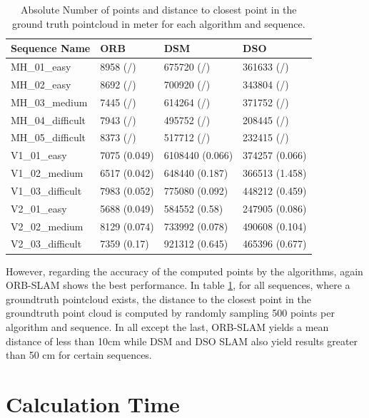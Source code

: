 	\begin{table}
	\caption{Absolute Number of points and distance to closest point in the ground truth pointcloud in meter for each algorithm and sequence.}
	\begin{tabular}{ |p{3cm}||p{3cm}|p{3cm}|p{3cm}|  }
	\hline
	Sequence Name& ORB & DSM & DSO \\
	\hline
	MH\_01\_easy & 8958 (/) & 675720 (/) & 361633 (/)\\
	MH\_02\_easy & 8692 (/) & 700920 (/) & 343804 (/)\\
	MH\_03\_medium & 7445 (/) & 614264 (/) & 371752 (/)\\
	MH\_04\_difficult & 7943 (/) & 495752 (/) & 208445 (/)\\
	MH\_05\_difficult & 8373 (/) & 517712 (/) & 232415 (/)\\
	V1\_01\_easy & 7075 (0.049) & 6108440 (0.066) & 374257 (0.066)\\
	V1\_02\_medium & 6517 (0.042) & 648440 (0.187) & 366513 (1.458)\\
	V1\_03\_difficult & 7983 (0.052) & 775080 (0.092) & 448212 (0.459)\\
	V2\_01\_easy & 5688 (0.049) & 584552 (0.58) & 247905 (0.086)\\
	V2\_02\_medium & 8129 (0.074)& 733992 (0.078) & 490608 (0.104)\\
	V2\_03\_difficult & 7359 (0.17) & 921312 (0.645) & 465396 (0.677)\\
	\hline
	\end{tabular}
	\label{table:pointcloud}
	\end{table}
	
	However, regarding the accuracy of the computed points by the algorithms, again ORB-SLAM shows the best performance. In table \ref{table:pointcloud}, 
	for all sequences, where a groundtruth pointcloud exists, the distance to the closest point in the groundtruth point cloud is computed by randomly sampling
	500 points per algorithm and sequence. In all except the last, ORB-SLAM yields a mean distance of less than 10cm while DSM and DSO SLAM also yield results 
	greater than 50 cm for certain sequences. 
	
	
	
	

\section{Calculation Time}

